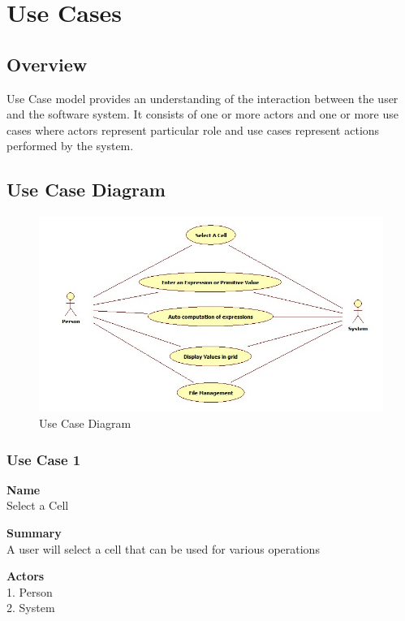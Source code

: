 \documentclass[12pt]{article}
\begin{document}
\section{Use Cases}

\subsection{Overview}
Use Case model provides an understanding of the interaction between the user and the software
system. It consists of one or more actors and one or more use cases where actors represent particular
role and use cases represent actions performed by the system. 
\clearpage
\subsection{Use Case Diagram}
\begin{figure}[htbp]
\includegraphics[scale=0.7]{USE_CASE_DIAGRAM.jpg}
\caption{Use Case Diagram}
\label{fig:use-case-diagram}
\end{figure}

\clearpage

\subsubsection{Use Case 1} \label{uc:1}

\noindent
{\bf Name}\\
Select a Cell

\noindent
{\bf Summary}\\
A user will select a cell that can be used for various operations

\noindent
{\bf Actors}\\
1. Person\\
2. System\\
\end{document}
